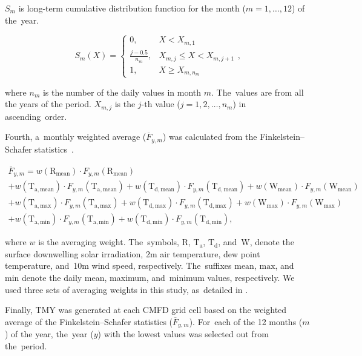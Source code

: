 \documentclass[atmosphere,article,accept,pdftex,moreauthors]{Definitions/mdpi}
\begin{document}
\(S_m\) is long-term cumulative distribution function for the month (\(m = 1, \dots, 12\)) of \mbox{the year.}
\begin{linenomath}
  \begin{equation}\label{eq:cdf_clim}
    S_m(X) = \begin{cases}
      0 ,                  & X < X_{m,1}                \\
      \frac{j - 0.5}{n_m}, & X_{m,j} \leq X < X_{m,j+1} \\
      1,                   & X \geq X_{m,n_m}
    \end{cases} \text{,}
  \end{equation}
\end{linenomath}
where \(n_m\) is the number of the daily values in month \(m\). The~values are from all the years of the period. \(X_{m,j}\) is the \(j\)-th value (\(j = 1, 2, \dots, n_m\)) in ascending~order.

Fourth, a~monthly weighted average (\(\overline{F}_{y,m}\)) was calculated from the Finkelstein--Schafer statistics~\cite{GBT42766-2023}.
\begin{linenomath}
  \begin{multline}\label{eq:weighted_fs}
    \overline{F}_{y,m} = w(\mathrm{R_{mean}}) \cdot F_{y,m}(\mathrm{R_{mean}}) \\
    + w(\mathrm{T_{a,mean}}) \cdot F_{y,m}(\mathrm{T_{a,mean}}) + w(\mathrm{T_{d,mean}}) \cdot F_{y,m}(\mathrm{T_{d,mean}}) + w(\mathrm{W_{mean}}) \cdot F_{y,m}(\mathrm{W_{mean}})\\
    + w(\mathrm{T_{a,max}}) \cdot F_{y,m}(\mathrm{T_{a,max}}) + w(\mathrm{T_{d,max}}) \cdot F_{y,m}(\mathrm{T_{d,max}})
    + w(\mathrm{W_{max}}) \cdot F_{y,m}(\mathrm{W_{max}}) \\
    + w(\mathrm{T_{a,min}}) \cdot F_{y,m}(\mathrm{T_{a,min}})  + w(\mathrm{T_{d,min}}) \cdot F_{y,m}(\mathrm{T_{d,min}})\text{,}
  \end{multline}
\end{linenomath}
where \(w\) is the averaging weight. The~symbols, \(\mathrm{R}\), \(\mathrm{T_a}\), \(\mathrm{T_d}\), and~\(\mathrm{W}\), denote the surface downwelling solar irradiation, 2m air temperature, dew point temperature, and~10m wind speed, respectively. The~suffixes \(\mathrm{mean}\), \(\mathrm{max}\), and~\(\mathrm{min}\) denote the daily mean, maximum, and~minimum values, respectively. We used three sets of averaging weights in this study, as~detailed in .

Finally, TMY was generated at each CMFD grid cell based on the weighted average of the Finkelstein--Schafer statistics (\(\overline{F}_{y,m}\)). For~each of the 12 months (\(m\)) of the year, the~year (\(y\)) with the lowest values was selected out from the~period.
\end{document}

